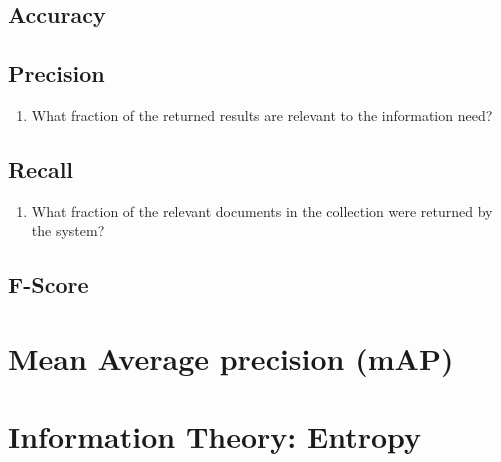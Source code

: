 \subsection{Accuracy}

\subsection{Precision}
\begin{enumerate}
    \item What fraction of the returned results are relevant to the information need? \cite{ir-1}
\end{enumerate}

\subsection{Recall}
\begin{enumerate}
    \item What fraction of the relevant documents in the collection were returned by the system? \cite{ir-1}
\end{enumerate}

\subsection{F-Score}


\section{Mean Average precision (mAP)}\label{Mean Average precision (mAP)}


\section{Information Theory: Entropy \cite{dnn-1,nlp-1}} \label{Information Theory: Entropy}

